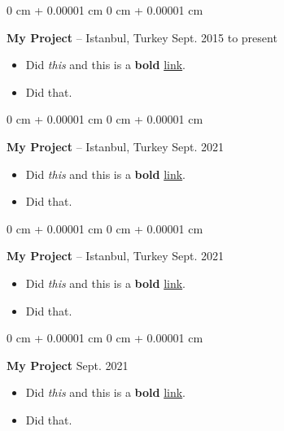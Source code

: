\documentclass[10pt, letterpaper]{article}
\newenvironment{highlights}{
    \begin{itemize}[
        topsep=0.10 cm,
        parsep=0.10 cm,
        partopsep=0pt,
        itemsep=0pt,
        leftmargin=0 cm + 10pt
    ]
}{
    \end{itemize}
        
    \vspace{-0.20cm}
} %
\newenvironment{onecolentry}{
    \begin{adjustwidth}{
        0 cm + 0.00001 cm
    }{
        0 cm + 0.00001 cm
    }
}{
    \end{adjustwidth}
} %
\begin{document}
        \vspace{0.1 cm}

        \begin{onecolentry}
            \textbf{My Project} -- Istanbul, Turkey \hfill Sept. 2015 to present
            \begin{highlights}
                \item Did \textit{this} and this is a \textbf{bold} \href{https://example.com}{link}.
                \item Did that.
            \end{highlights}
        \end{onecolentry}

        \vspace{0.1 cm}

        \begin{onecolentry}
            \textbf{My Project} -- Istanbul, Turkey \hfill Sept. 2021
            \begin{highlights}
                \item Did \textit{this} and this is a \textbf{bold} \href{https://example.com}{link}.
                \item Did that.
            \end{highlights}
        \end{onecolentry}

        \vspace{0.1 cm}

        \begin{onecolentry}
            \textbf{My Project} -- Istanbul, Turkey \hfill Sept. 2021
            \begin{highlights}
                \item Did \textit{this} and this is a \textbf{bold} \href{https://example.com}{link}.
                \item Did that.
            \end{highlights}
        \end{onecolentry}

        \vspace{0.1 cm}

        \begin{onecolentry}
            \textbf{My Project} \hfill Sept. 2021
            \begin{highlights}
                \item Did \textit{this} and this is a \textbf{bold} \href{https://example.com}{link}.
                \item Did that.
            \end{highlights}
        \end{onecolentry}
\end{document}
